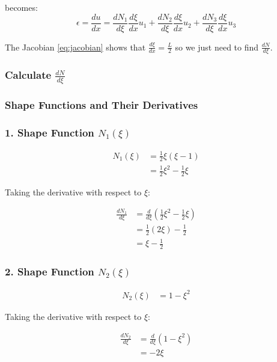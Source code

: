 \documentclass{article}
\begin{document}
becomes:
\begin{equation}
    \epsilon = \frac{du}{dx} = \frac{dN_1}{d\xi} \frac{d\xi}{dx} u_1 + \frac{dN_2}{d\xi} \frac{d\xi}{dx} u_2 + \frac{dN_3}{d\xi} \frac{d\xi}{dx} u_3
\end{equation}

The Jacobian \ref{eq:jacobian} shows that $\frac{d\xi}{dx} = \frac{L}{2}$ so we just need to find $\frac{dN}{d\xi}$.

\subsubsection*{Calculate $\frac{dN}{d\xi}$}

\subsubsection*{Shape Functions and Their Derivatives}

\subsubsection*{1. Shape Function \( N_1(\xi) \)}

\begin{align*}
    N_1(\xi) &= \frac{1}{2} \xi (\xi - 1) \\
             &= \frac{1}{2} \xi^2 - \frac{1}{2} \xi
\end{align*}

Taking the derivative with respect to \( \xi \):

\begin{align*}
    \frac{dN_1}{d\xi} &= \frac{d}{d\xi} \left( \frac{1}{2} \xi^2 - \frac{1}{2} \xi \right) \\
                       &= \frac{1}{2} (2\xi) - \frac{1}{2} \\
                       &= \xi - \frac{1}{2}
\end{align*}

\subsubsection*{2. Shape Function \( N_2(\xi) \)}

\begin{align*}
    N_2(\xi) &= 1 - \xi^2
\end{align*}

Taking the derivative with respect to \( \xi \):

\begin{align*}
    \frac{dN_2}{d\xi} &= \frac{d}{d\xi} (1 - \xi^2) \\
                       &= -2\xi
\end{align*}
\end{document}
